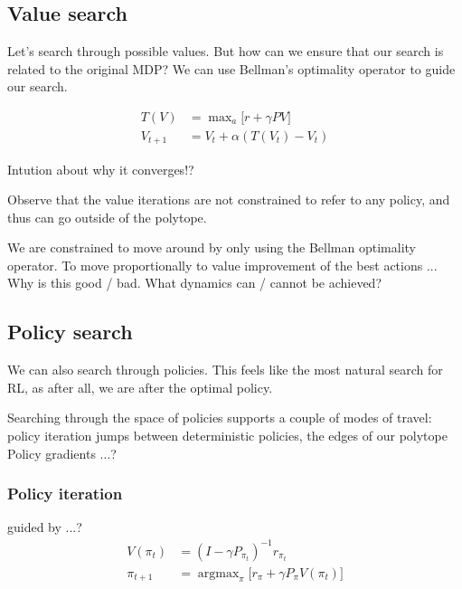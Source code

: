 
\subsection{Value search}

Let's search through possible values. But how can we ensure that our search is
related to the original MDP? We can use Bellman's optimality operator to guide our search.


\begin{align}
T(V) &= \mathop{\text{max}}_a \big[r + \gamma PV\big] \\
V_{t+1} &= V_t + \alpha (T(V_t) - V_t)
\end{align}

Intution about why it converges!?


Observe that the value iterations are not constrained to refer to any policy,
and thus can go outside of the polytope. \cite{Dadashi2018}

We are constrained to move around by only using the Bellman optimality operator.
To move proportionally to value improvement of the best actions ...
Why is this good / bad. What dynamics can / cannot be achieved?

\subsection{Policy search}

We can also search through policies. This feels like the most natural search for RL,
as after all, we are after the optimal policy.

Searching through the space of policies supports a couple of modes of travel:
policy iteration jumps between deterministic policies, the edges of our polytope
Policy gradients ...?

\subsubsection{Policy iteration}

guided by ...?
\begin{align}
V(\pi_t) &=  (I - \gamma P_{\pi_t})^{-1} r_{\pi_t} \\
\pi_{t+1} &= \mathop{\text{argmax}}_\pi \big[r_{\pi} + \gamma P_{\pi}V(\pi_t) \big]
\end{align}


